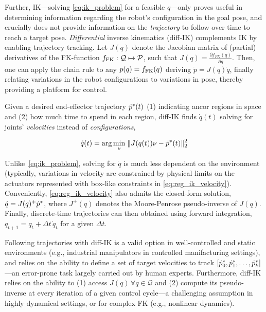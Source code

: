 Further, IK---solving \ref{eq:ik_problem} for a feasible \( q \)---only proves useful in determining information regarding the robot's configuration in the goal pose, and crucially does not provide information on the \emph{trajectory} to follow over time to reach a target pose.
\emph{Differential} inverse kinematics (diff-IK) complements IK by enabling trajectory tracking. 
Let \( J(q) \) denote the Jacobian matrix of (partial) derivatives of the FK-function \( f_{\text{FK}}: \mathcal Q \mapsto \mathcal P \), such that \( J(q) = \frac{\partial f_{FK}(q)}{\partial q } \).
Then, one can apply the chain rule to any \( p(q) = f_{\text{FK}}(q) \) deriving \( \dot p = J(q) \dot q \), finally relating variations in the robot configurations to variations in pose, thereby providing a platform for control.

Given a desired end-effector trajectory \( \dot {p}^*(t) \) (1) indicating ancor regions in space  and (2) how much time to spend in each region, diff-IK finds \( \dot q(t) \) solving for joints' \emph{velocities} instead of \emph{configurations},

\begin{align}
\dot q(t) = \arg\min_\nu \; \lVert J(q(t)) \nu - \dot {p}^* (t) \rVert_2^2
\label{eq:reg_ik_velocity}
\end{align}

Unlike~\ref{eq:ik_problem}, solving for \( \dot q \) is much less dependent on the environment (typically, variations in velocity are constrained by physical limits on the actuators represented with box-like constraints in \ref{eq:reg_ik_velocity}).
Conveniently, \ref{eq:reg_ik_velocity} also admits the closed-form solution, \( \dot q = J(q)^+ \dot {p}^* \), where \( J^+(q) \) denotes the Moore-Penrose pseudo-inverse of \( J(q) \).
Finally, discrete-time trajectories can then obtained using forward integration, \( q_{t+1} = q_t + \Delta t\,\dot q_t \) for a given \( \Delta t \).

Following trajectories with diff-IK is a valid option in well-controlled and static environments (e.g., industrial manipulators in controlled manifacturing settings), and relies on the ability to define a set of target velocities to track \( [\dot {p}^*_0, \dot {p}^*_1, \dots, \dot {p}^*_k ] \)---an error-prone task largely carried out by human experts.
Furthermore, diff-IK relies on the ability to (1) access \( J(q) \, \forall q \in \mathcal Q \) and (2) compute its pseudo-inverse at every iteration of a given control cycle---a challenging assumption in highly dynamical settings, or for complex FK (e.g., nonlinear dynamics).

